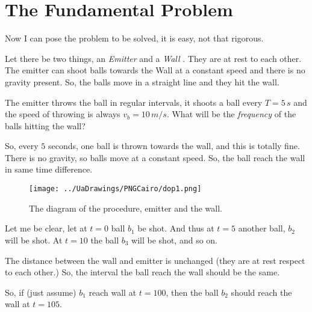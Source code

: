 \documentclass[a4paper]{article}
\begin{document}
\section{The Fundamental Problem}
Now I can pose the problem to be solved, it is easy, not that rigorous. 
\begin{tcolorbox}
    Let there be two things, an \emph{Emitter } and a \emph{Wall }. They are at rest to each other. \\
The emitter can shoot balls towards the Wall at a constant speed and there is no gravity present. So, the balls move in a straight 
line and they hit the wall. 

The emitter throws the ball in regular intervals, it shoots a ball every $T = 5 \, s$  and the speed of throwing is always 
$v_b = 10 \, m/s   $. What will be the \emph{frequency }of the balls hitting the wall?  
\end{tcolorbox} 
So, every $5$  seconds, one ball is thrown towards the wall, and this is totally fine. There is no gravity, so balls move at 
a constant speed. So, the ball reach the wall in same time difference. 
\begin{figure} [hbtp]
    \centering
    \texttt{[image: ../UaDrawings/PNGCairo/dop1.png]}
    \caption{The diagram of the procedure, emitter and the wall.}
\end{figure} 
Let me be clear, let at $t=0$  ball $b_1 $ be shot. And thus at $t=5$  another ball, $b_2 $  will be shot. At $t=10$  the ball
$b_3 $  will be shot, and so on. 

The distance between the wall and emitter is unchanged (they are at rest respect to each other.) So, the interval the ball reach 
the wall should be the same. 

So, if (just assume) $b_1 $  reach wall at $t = 100$, then the ball $b_2$  should reach the wall at $t=105$. 
\end{document}
